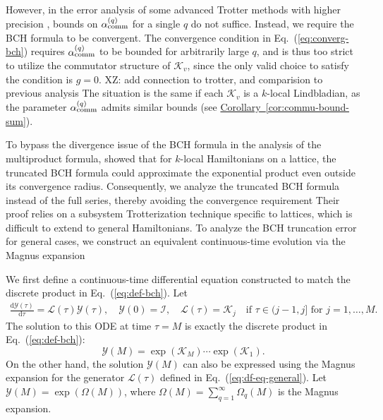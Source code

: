 \documentclass[11pt]{article}
\newcommand{\eq}[1]{(\ref{eq:#1})}
\newcommand{\cor}[1]{\hyperref[cor:#1]{Corollary~\ref*{cor:#1}}}
\renewcommand{\d}{\mathrm{d}}
\newcommand{\mc}{\mathcal}
\newcommand{\xz}[1]{{\color{cyan} XZ: #1}}
\begin{document}
However, in the error analysis of some advanced Trotter methods with higher precision \cite{aftab2024multi, watson2025exponentially}, bounds on $\alpha_{\rm comm}^{(q)}$ for a single $q$ do not suffice. Instead, we require the BCH formula to be convergent. The convergence condition in Eq.~\eq{converg-bch} requires $\alpha_{\rm comm}^{(q)}$ to be bounded for arbitrarily large $q$, and is thus too strict to utilize the commutator structure of $\mc K_v$, since the only valid choice to satisfy the condition is $g = 0$. \xz{add connection to trotter, and comparision to previous analysis} The situation is the same if each $\mc K_v$ is a $k$-local Lindbladian, as the parameter $\alpha_{\rm comm}^{(q)}$ admits similar bounds (see \cor{commu-bound-sum}). 

To bypass the divergence issue of the BCH formula in the analysis of the multiproduct formula, \citet{mizuta2025commutator} showed that for $k$-local Hamiltonians on a lattice, the truncated BCH formula could approximate the exponential product even outside its convergence radius. Consequently, we analyze the truncated BCH formula instead of the full series, thereby avoiding the convergence requirement Their proof relies on a subsystem Trotterization technique specific to lattices, which is difficult to extend to general Hamiltonians. To analyze the BCH truncation error for general cases, we construct an equivalent continuous-time evolution via the Magnus expansion

We first define a continuous-time differential equation constructed to match the discrete product in Eq.~\eq{def-bch}. Let\begin{align}\label{eq:df-eq-general}\frac{\d \mc Y(\tau)}{\d \tau} = \mc L(\tau) \mc Y(\tau), \quad \mc Y(0)= \mc I, \quad \mc L(\tau) = \mc K_j \quad \text{if } \tau \in (j-1, j] \text{ for } j=1,\ldots,M.\end{align}The solution to this ODE at time $\tau=M$ is exactly the discrete product in Eq.~\eq{def-bch}:\[\mc Y(M)  = \exp(\mc K_M) \cdots \exp(\mc K_1) .
\]
On the other hand, the solution $\mc Y(M)$ can also be expressed using the Magnus expansion for the generator $\mc L(\tau)$ defined in Eq.~\eq{df-eq-general}. Let $\mc Y(M) = \exp(\Omega(M))$, where $\Omega(M) = \sum_{q=1}^{\infty} \Omega_q(M)$ is the Magnus expansion.
\end{document}
